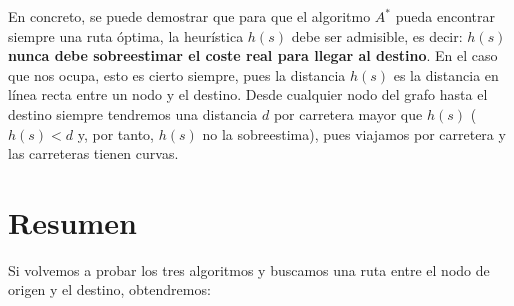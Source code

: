 \documentclass{article}
\begin{document}
En concreto, se puede demostrar que para que el algoritmo $A^*$ pueda encontrar siempre una ruta óptima, la heurística $h(s)$ debe ser admisible, es decir: $h(s)$ \textbf{nunca debe sobreestimar el coste real para llegar al destino}. En el caso que nos ocupa, esto es cierto siempre, pues la distancia $h(s)$ es la distancia en línea recta entre un nodo y el destino. Desde cualquier nodo del grafo hasta el destino siempre tendremos una distancia $d$ por carretera mayor que $h(s)$ ($h(s) < d$ y, por tanto, $h(s)$ no la sobreestima), pues viajamos por carretera y las carreteras tienen curvas.

\section{Resumen}
Si volvemos a probar los tres algoritmos y buscamos una ruta entre el nodo de origen y el destino, obtendremos:
\end{document}
